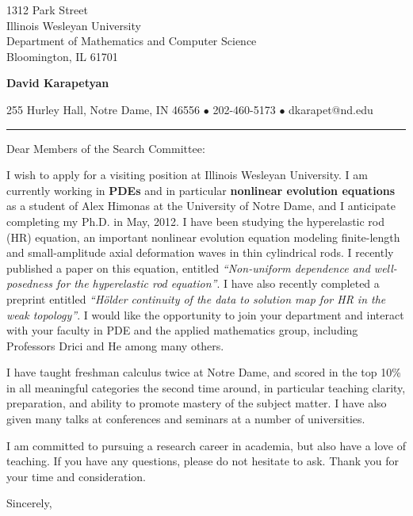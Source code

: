 \documentclass[12pt]{letter}
\date{\vspace{0.5cm}\flushleft \today}
\begin{document}
\begin{letter}{1312 Park Street \\
Illinois Wesleyan University \\
Department of Mathematics and Computer Science \\
Bloomington, IL 61701 
}
        \begin{center}
{\bf {\Large David Karapetyan}}
\end{center}

\begin{center}
{255 Hurley Hall, Notre Dame, IN 46556  $\bullet$
202-460-5173 $\bullet$ dkarapet@nd.edu
}
\end{center}
\hrule

\opening{Dear Members of the Search Committee:\\}
%
%
I wish to apply for a visiting position at Illinois Wesleyan
University. I am currently working in \textbf{PDEs} and in
particular \textbf{nonlinear evolution equations} as a student of Alex Himonas
at the University of Notre Dame, and I anticipate
completing my Ph.D. in May, 2012. I have been studying the hyperelastic rod (HR)
equation, an important nonlinear evolution equation modeling finite-length and
small-amplitude axial deformation waves in thin cylindrical rods. I recently
published a paper on this equation, entitled {\it ``Non-uniform dependence and
well-posedness for the hyperelastic rod equation''}. I have also recently
completed a preprint entitled {\it ``H\"older continuity of the data to solution
map for HR in the weak topology''}. I would like the opportunity to join your
department and interact with your faculty in PDE and the applied mathematics
group, including Professors Drici and He among many others.

I have taught freshman calculus twice at Notre Dame, and scored in the top 10\%
in all meaningful categories the second time around, in particular teaching
clarity, preparation, and ability to promote mastery of the subject matter. I
have also given many talks at conferences and seminars at a number of
universities. 

I am committed to pursuing a research career in academia, but also have a love
of teaching. If you have any questions, please do not hesitate to ask. Thank you for your time and consideration. 

\closing{Sincerely,}


\end{letter}
\end{document}

